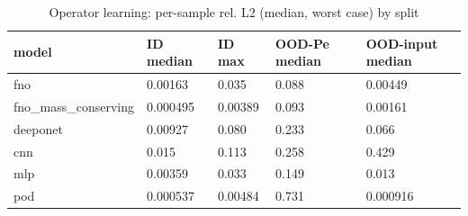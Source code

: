 \begin{table}[t]\centering\small\caption{Operator learning: per-sample rel. L2 (median, worst case) by split}\label{tab:phase4}
\begin{tabular}{lllll}\toprule
model & ID median & ID max & OOD-Pe median & OOD-input median \\ \midrule
fno & 0.00163 & 0.035 & 0.088 & 0.00449 \\
fno\_mass\_conserving & 0.000495 & 0.00389 & 0.093 & 0.00161 \\
deeponet & 0.00927 & 0.080 & 0.233 & 0.066 \\
cnn & 0.015 & 0.113 & 0.258 & 0.429 \\
mlp & 0.00359 & 0.033 & 0.149 & 0.013 \\
pod & 0.000537 & 0.00484 & 0.731 & 0.000916 \\
\bottomrule\end{tabular}\end{table}
